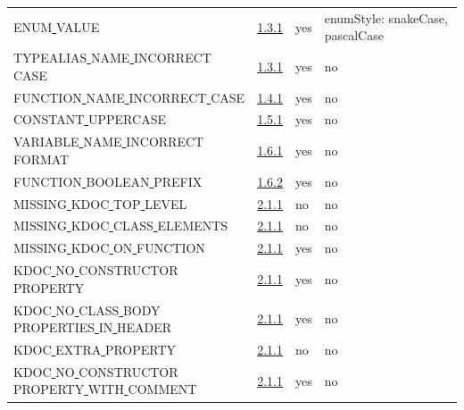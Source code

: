 \begin{longtable}{ |l|p{0.8cm}|p{0.8cm}| p{3cm} | }
ENUM\underline{ }VALUE & \hyperref[sec:1.3.1]{1.3.1} &  yes  &   enumStyle: snakeCase, pascalCase  \\
TYPEALIAS\underline{ }NAME\underline{ }INCORRECT\underline{ }CASE & \hyperref[sec:1.3.1]{1.3.1} &  yes  &   no  \\
FUNCTION\underline{ }NAME\underline{ }INCORRECT\underline{ }CASE & \hyperref[sec:1.4.1]{1.4.1} &  yes  &   no  \\
CONSTANT\underline{ }UPPERCASE & \hyperref[sec:1.5.1]{1.5.1} &  yes  &   no  \\
VARIABLE\underline{ }NAME\underline{ }INCORRECT\underline{ }FORMAT & \hyperref[sec:1.6.1]{1.6.1} &  yes  &   no  \\
FUNCTION\underline{ }BOOLEAN\underline{ }PREFIX & \hyperref[sec:1.6.2]{1.6.2} &  yes  &   no  \\
MISSING\underline{ }KDOC\underline{ }TOP\underline{ }LEVEL & \hyperref[sec:2.1.1]{2.1.1} &  no  &   no  \\
MISSING\underline{ }KDOC\underline{ }CLASS\underline{ }ELEMENTS & \hyperref[sec:2.1.1]{2.1.1} &  no  &   no  \\
MISSING\underline{ }KDOC\underline{ }ON\underline{ }FUNCTION & \hyperref[sec:2.1.1]{2.1.1} &  yes  &   no  \\
KDOC\underline{ }NO\underline{ }CONSTRUCTOR\underline{ }PROPERTY & \hyperref[sec:2.1.1]{2.1.1} &  yes  &  no                                                                                                                                                                                                                         \\
KDOC\underline{ }NO\underline{ }CLASS\underline{ }BODY\underline{ }PROPERTIES\underline{ }IN\underline{ }HEADER & \hyperref[sec:2.1.1]{2.1.1} &  yes  &  no                                                                                                                                                                                                                         \\
KDOC\underline{ }EXTRA\underline{ }PROPERTY & \hyperref[sec:2.1.1]{2.1.1} &  no  &  no   \\
KDOC\underline{ }NO\underline{ }CONSTRUCTOR\underline{ }PROPERTY\underline{ }WITH\underline{ }COMMENT & \hyperref[sec:2.1.1]{2.1.1} &  yes  &  no                                                                                                                                                                                                                         \\

\end{longtable}
